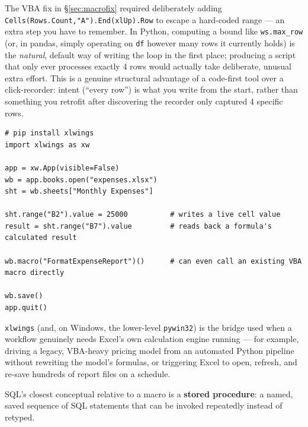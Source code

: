 \documentclass[11pt,a4paper]{article}
\begin{document}
\begin{keyconcept}
The VBA fix in \S\ref{sec:macrofix} required deliberately adding \texttt{Cells(Rows.Count,\allowbreak"A").End(xlUp).Row} to escape a hard-coded range --- an extra step you have to remember. In Python, computing a bound like \texttt{ws.max\_row} (or, in pandas, simply operating on \texttt{df} however many rows it currently holds) is the \emph{natural}, default way of writing the loop in the first place; producing a script that only ever processes exactly 4 rows would actually take deliberate, unusual extra effort. This is a genuine structural advantage of a code-first tool over a click-recorder: intent (``every row'') is what you write from the start, rather than something you retrofit after discovering the recorder only captured 4 specific rows.
\end{keyconcept}

\begin{lstlisting}[style=pythonstyle, caption={xlwings: driving live Excel (and even calling VBA) from Python, when you need Excel's own engine rather than just editing the file}]
# pip install xlwings
import xlwings as xw

app = xw.App(visible=False)
wb = app.books.open("expenses.xlsx")
sht = wb.sheets["Monthly Expenses"]

sht.range("B2").value = 25000          # writes a live cell value
result = sht.range("B7").value         # reads back a formula's calculated result

wb.macro("FormatExpenseReport")()      # can even call an existing VBA macro directly

wb.save()
app.quit()
\end{lstlisting}

\begin{financeapp}
\texttt{xlwings} (and, on Windows, the lower-level \texttt{pywin32}) is the bridge used when a workflow genuinely needs Excel's own calculation engine running --- for example, driving a legacy, VBA-heavy pricing model from an automated Python pipeline without rewriting the model's formulas, or triggering Excel to open, refresh, and re-save hundreds of report files on a schedule.
\end{financeapp}

SQL's closest conceptual relative to a macro is a \textbf{stored procedure}: a named, saved sequence of SQL statements that can be invoked repeatedly instead of retyped.
\end{document}
